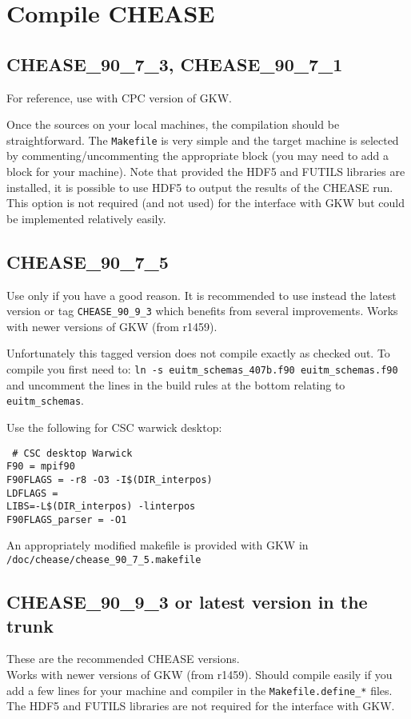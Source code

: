 \documentclass[a4paper,12pt]{article}
\begin{document}
\section{Compile CHEASE}

\subsection{CHEASE\_90\_7\_3, CHEASE\_90\_7\_1}

For reference, use with CPC version of GKW.

Once the sources on your local machines, the compilation should be straightforward. The \texttt{Makefile} is very simple and the target machine is selected by commenting/uncommenting the appropriate block (you may need to add a block for your machine).
Note that provided the HDF5 and FUTILS libraries are installed, it is possible to use HDF5 to output the results of the CHEASE run. This option is not required (and not used) for the interface with GKW but could be implemented relatively easily.

\subsection{CHEASE\_90\_7\_5}

Use only if you have a good reason. It is recommended to use instead the latest version or tag \texttt{CHEASE\_90\_9\_3} which benefits from several improvements. Works with newer versions of GKW (from r1459). 

Unfortunately this tagged version does not compile exactly as checked out.  To compile you first need to:
\texttt{ln -s euitm\_schemas\_407b.f90 euitm\_schemas.f90} and uncomment the lines in the build rules at the bottom relating to \texttt{euitm\_schemas}.

Use the following for CSC warwick desktop:
\begin{verbatim}
 # CSC desktop Warwick
F90 = mpif90
F90FLAGS = -r8 -O3 -I$(DIR_interpos)
LDFLAGS =
LIBS=-L$(DIR_interpos) -linterpos
F90FLAGS_parser = -O1
\end{verbatim}
An appropriately modified makefile is provided with GKW in \texttt{/doc/chease/chease\_90\_7\_5.makefile}

\subsection{CHEASE\_90\_9\_3 or latest version in the trunk}

These are the recommended CHEASE versions.\\
Works with newer versions of GKW (from r1459).  Should compile easily if you add a few lines for your machine and compiler in the \texttt{Makefile.define\_*} files. The HDF5 and FUTILS libraries are not required for the interface with GKW.
\end{document}
